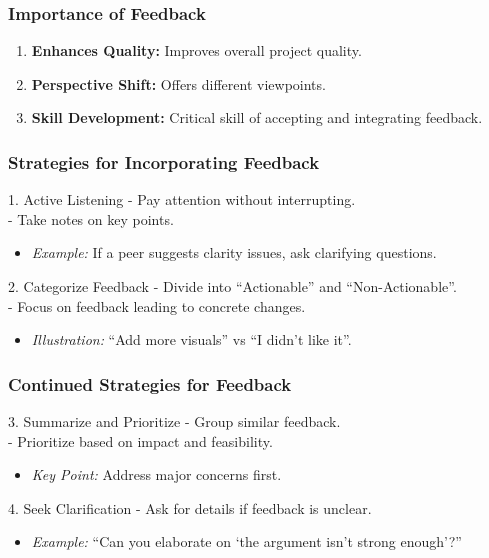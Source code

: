 \documentclass[aspectratio=169]{beamer}
\begin{document}
\begin{frame}[fragile]
    \frametitle{Importance of Feedback}
    \begin{enumerate}
        \item \textbf{Enhances Quality:} Improves overall project quality.
        \item \textbf{Perspective Shift:} Offers different viewpoints.
        \item \textbf{Skill Development:} Critical skill of accepting and integrating feedback.
    \end{enumerate}
\end{frame}

\begin{frame}[fragile]
    \frametitle{Strategies for Incorporating Feedback}
    \begin{block}{1. Active Listening}
        - Pay attention without interrupting.\\
        - Take notes on key points.
        \begin{itemize}
            \item \textit{Example:} If a peer suggests clarity issues, ask clarifying questions.
        \end{itemize}
    \end{block}
    
    \begin{block}{2. Categorize Feedback}
        - Divide into ``Actionable'' and ``Non-Actionable''.\\
        - Focus on feedback leading to concrete changes.
        \begin{itemize}
            \item \textit{Illustration:} “Add more visuals” vs “I didn't like it”.
        \end{itemize}
    \end{block}
\end{frame}

\begin{frame}[fragile]
    \frametitle{Continued Strategies for Feedback}
    \begin{block}{3. Summarize and Prioritize}
        - Group similar feedback.\\
        - Prioritize based on impact and feasibility.
        \begin{itemize}
            \item \textit{Key Point:} Address major concerns first.
        \end{itemize}
    \end{block}
    
    \begin{block}{4. Seek Clarification}
        - Ask for details if feedback is unclear.
        \begin{itemize}
            \item \textit{Example:} “Can you elaborate on ‘the argument isn’t strong enough’?”
        \end{itemize}
    \end{block}
\end{frame}
\end{document}
